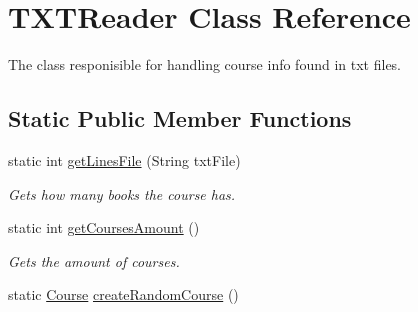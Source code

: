 \hypertarget{classTXTReader}{}\section{T\+X\+T\+Reader Class Reference}
\label{classTXTReader}


The class responisible for handling course info found in txt files.  


\subsection*{Static Public Member Functions}
\begin{DoxyCompactItemize}
\item 
static int \hyperlink{classTXTReader_a0192ce4884c215947120fabf9e4f7d97}{get\+Lines\+File} (String txt\+File)
\begin{DoxyCompactList}\small\item\em Gets how many books the course has. \end{DoxyCompactList}\item 
static int \hyperlink{classTXTReader_a5b841b6280e72959bded19fa507e2385}{get\+Courses\+Amount} ()
\begin{DoxyCompactList}\small\item\em Gets the amount of courses. \end{DoxyCompactList}\item 
\hypertarget{classTXTReader_ae4c57bb2c5f7eb7569bf41b0989d4a8d}{}static \hyperlink{classCourse}{Course} \hyperlink{classTXTReader_ae4c57bb2c5f7eb7569bf41b0989d4a8d}{create\+Random\+Course} ()\label{classTXTReader_ae4c57bb2c5f7eb7569bf41b0989d4a8d}


\end{DoxyCompactItemize}
